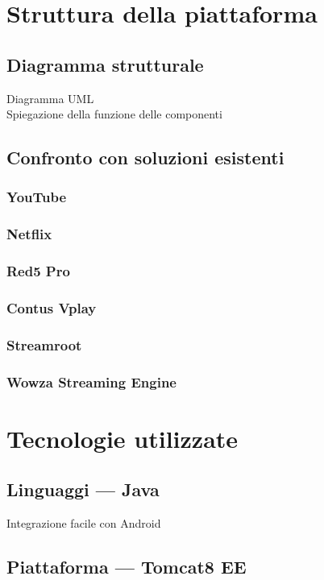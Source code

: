 	 \section{Struttura della piattaforma}
	 \subsection{Diagramma strutturale}
	 Diagramma UML\\
	 Spiegazione della funzione delle componenti

	 \subsection{Confronto con soluzioni esistenti}
		\subsubsection{YouTube}
		\subsubsection{Netflix}
		\subsubsection{Red5 Pro}
		\subsubsection{Contus Vplay}
		\subsubsection{Streamroot}
		\subsubsection{Wowza Streaming Engine}

\section{Tecnologie utilizzate}
	\subsection{Linguaggi --- Java}
	 Integrazione facile con Android

	\subsection{Piattaforma --- Tomcat8 EE}

